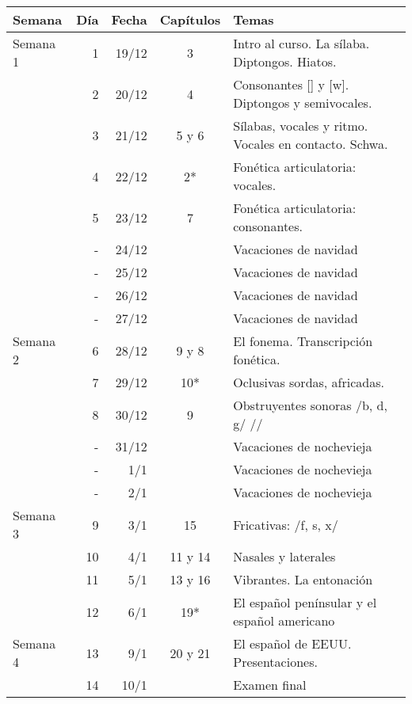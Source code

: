 \documentclass[12pt]{article}
\begin{document}
\vspace{.5in}
\begin{center}
\begin{tabular*}{\textwidth}{@{}|lrrcp{8.9cm}|@{}}
	\hline
	\rowcolor[gray]{0.9}
	Semana & Día  & Fecha & Capítulos & Temas \\
	\hline
	\rowcolor[gray]{0.8}
	Semana 1 & 1  & 19/12 &    3      & Intro al curso. La sílaba. Diptongos. Hiatos.     \\
	\rowcolor[gray]{0.9}
			 & 2  & 20/12 &    4      & Consonantes [\textctj] y [w]. Diptongos y semivocales.      \\
	\rowcolor[gray]{0.8}
			 & 3  & 21/12 &  5 y 6    & Sílabas, vocales y ritmo. Vocales en contacto. Schwa.      \\
	\rowcolor[gray]{0.9}
			 & 4  & 22/12 &    2*     & Fonética articulatoria: vocales.      \\
	\rowcolor[gray]{0.8}
			 & 5  & 23/12 &    7      & Fonética articulatoria: consonantes.      \\
	\rowcolor[gray]{0.9}
			 & -  & 24/12 &           & Vacaciones de navidad       \\
	\rowcolor[gray]{0.8}
			 & -  & 25/12 &           & Vacaciones de navidad       \\
	\rowcolor[gray]{0.9}
			 & -  & 26/12 &           & Vacaciones de navidad       \\
	\rowcolor[gray]{0.8}
			 & -  & 27/12 &           & Vacaciones de navidad       \\
	\rowcolor[gray]{0.9}
	Semana 2 & 6  & 28/12 &  9 y 8    & El fonema. Transcripción fonética.      \\
	\rowcolor[gray]{0.8}
			 & 7  & 29/12 &   10*     & Oclusivas sordas, africadas.      \\
	\rowcolor[gray]{0.9}
			 & 8  & 30/12 &   9       & Obstruyentes sonoras /b, d, g/ /\textctj/       \\
	\rowcolor[gray]{0.8}
			 & -  & 31/12 &           & Vacaciones de nochevieja      \\
	\rowcolor[gray]{0.9}
			 & -  & 1/1   &           & Vacaciones de nochevieja      \\
	\rowcolor[gray]{0.8}
			 & -  & 2/1   &           & Vacaciones de nochevieja      \\
	\rowcolor[gray]{0.9}
	Semana 3 & 9  & 3/1   &   15      & Fricativas: /f, s, x/      \\
	\rowcolor[gray]{0.8}
			 & 10 & 4/1   &  11 y 14  & Nasales y laterales      \\
	\rowcolor[gray]{0.9}
			 & 11 & 5/1   &  13 y 16  & Vibrantes. La entonación      \\
	\rowcolor[gray]{0.8}
			 & 12 & 6/1   &   19*     & El español penínsular y el español americano     \\
	\rowcolor[gray]{0.9}
	Semana 4 & 13 & 9/1   &  20 y 21  & El español de EEUU. Presentaciones.      \\
	\rowcolor[gray]{0.8}
			 & 14 & 10/1  &           & Examen final     \\
	\hline
\end{tabular*}
\end{center}
\end{document}
